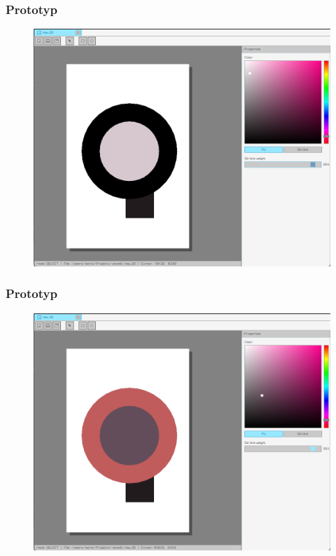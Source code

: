 \documentclass[
	11pt,]{beamer}
\begin{document}
\begin{frame}
	\frametitle{Prototyp}
	
	\begin{figure}
		\includegraphics[height=0.7\textheight]{figures/pro8.png}
	\end{figure}
\end{frame}

\begin{frame}
	\frametitle{Prototyp}
	
	\begin{figure}
		\includegraphics[height=0.7\textheight]{figures/pro9.png}
	\end{figure}
\end{frame}
\end{document}
